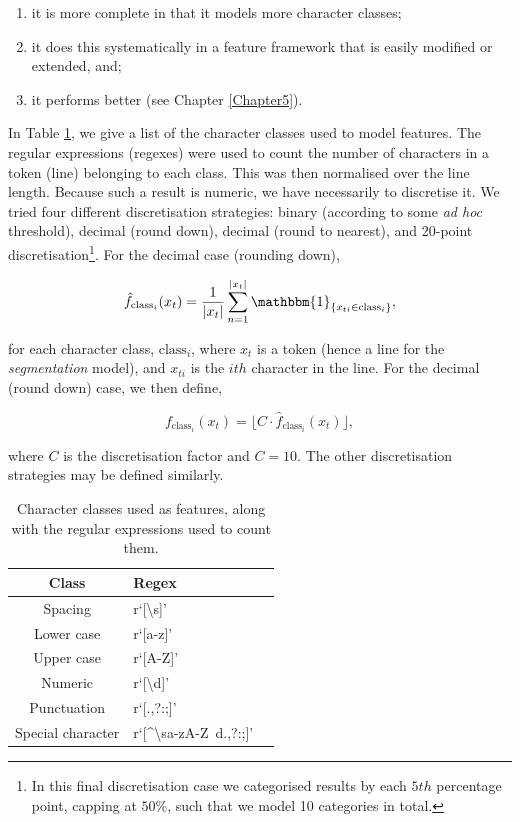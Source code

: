 \begin{enumerate}
\item it is more complete in that it models more character classes;
\item it does this systematically in a feature framework that is easily modified or extended, and;
\item it performs better (see Chapter \ref{Chapter5}).
\end{enumerate}

In Table \ref{table:characterclasses}, we give a list of the character classes used to model features. The regular expressions (regexes) were used to count the number  of characters in a token (line) belonging to each class. This was then normalised over the line length. Because such a result is numeric, we have necessarily to discretise it. We tried four different discretisation strategies: binary (according to some \emph{ad hoc} threshold), decimal (round down), decimal (round to nearest), and 20-point discretisation\footnote{In this final discretisation case we categorised results by each $5th$ percentage point, capping at $50\%$, such that we model 10 categories in total.}. For the decimal case (rounding down),

\begin{equation}
\hat f_{\text{class}_i}(x_t) = \frac{1}{|x_t|}\sum_{n=1}^{|x_t|} \mathbbm{1}_{\{x_{ti} \in \text{class}_i\}},
\label{eq:classfunctions}
\end{equation}

for each character class, $\text{class}_i$, where $x_t$ is a token (hence a line for the \emph{segmentation} model), and $x_{ti}$ is the $ith$ character in the line. For the decimal (round down) case, we then define,

\begin{equation}
f_{\text{class}_i}(x_t) = \big\lfloor C \cdot\hat f_{\text{class}_i}(x_t)\big\rfloor,
\label{eq:classfunctionsdisc}
\end{equation}

where $C$ is the discretisation factor and $C = 10$. The other discretisation strategies may be defined similarly.

\begin{table}[h]
\begin{center}
\begin{tabular}{|c|l|l|}
\hline
Class & Regex\\
\hline
Spacing & r`[\textbackslash s]'\\
Lower case & r`[a-z]'\\
Upper case & r`[A-Z]'\\
Numeric & r`[\textbackslash d]'\\
Punctuation & r`[\(\).,?:;]'\\
Special character & r`[\^{}\textbackslash sa-zA-Z\ d\(\).,?:;]'\\
\hline
\end{tabular}
\caption[Character classes used as features, along with the regular expressions used to count them.]{Character classes used as features, along with the regular expressions used to count them.}
\label{table:characterclasses}
\end{center}
\end{table}


